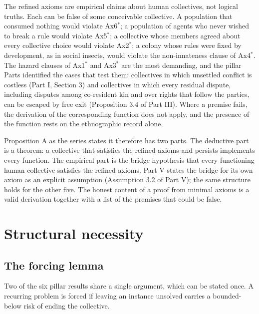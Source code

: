 \documentclass[11pt,letterpaper]{article}
\theoremstyle{definition}
\theoremstyle{remark}
\begin{document}
The refined axioms are empirical claims about human collectives, not logical truths. Each can be false of some conceivable collective. A population that consumed nothing would violate Ax6$^{*}$; a population of agents who never wished to break a rule would violate Ax5$^{*}$; a collective whose members agreed about every collective choice would violate Ax2$^{*}$; a colony whose rules were fixed by development, as in social insects, would violate the non-innateness clause of Ax4$^{*}$. The hazard clauses of Ax1$^{*}$ and Ax3$^{*}$ are the most demanding, and the pillar Parts identified the cases that test them: collectives in which unsettled conflict is costless (Part I, Section 3) and collectives in which every residual dispute, including disputes among co-resident kin and over rights that follow the parties, can be escaped by free exit (Proposition 3.4 of Part III). Where a premise fails, the derivation of the corresponding function does not apply, and the presence of the function rests on the ethnographic record alone.

Proposition A as the series states it therefore has two parts. The deductive part is a theorem: a collective that satisfies the refined axioms and persists implements every function. The empirical part is the bridge hypothesis that every functioning human collective satisfies the refined axioms. Part V states the bridge for its own axiom as an explicit assumption (Assumption 3.2 of Part V); the same structure holds for the other five. The honest content of a proof from minimal axioms is a valid derivation together with a list of the premises that could be false.

\section{Structural necessity}
\label{sec:necessity}

\subsection{The forcing lemma}

Two of the six pillar results share a single argument, which can be stated once. A recurring problem is forced if leaving an instance unsolved carries a bounded-below risk of ending the collective.
\end{document}
